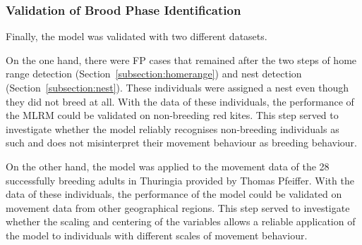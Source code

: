 \subsubsection{Validation of Brood Phase Identification}
Finally, the model was validated with two different datasets.

On the one hand, there were FP cases that remained after the two steps of home range detection (Section~\ref{subsection:homerange}) and nest detection (Section~\ref{subsection:nest}). These individuals were assigned a nest even though they did not breed at all. With the data of these individuals, the performance of the MLRM could be validated on non-breeding red kites. This step served to investigate whether the model reliably recognises non-breeding individuals as such and does not misinterpret their movement behaviour as breeding behaviour.

On the other hand, the model was applied to the movement data of the 28 successfully breeding adults in Thuringia provided by Thomas Pfeiffer. With the data of these individuals, the performance of the model could be validated on movement data from other geographical regions. This step served to investigate whether the scaling and centering of the variables allows a reliable application of the model to individuals with different scales of movement behaviour.